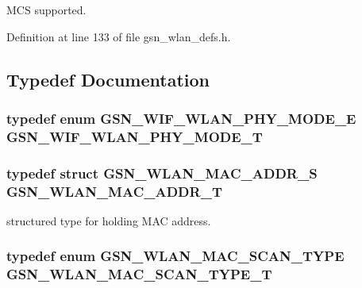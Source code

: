 MCS supported. 



Definition at line 133 of file gsn\_\-wlan\_\-defs.h.



\subsection{Typedef Documentation}
\hypertarget{a00641_ga9f600b5e4ee36d4315abb0cd1e0b1a78}{
\subsubsection[{GSN\_\-WIF\_\-WLAN\_\-PHY\_\-MODE\_\-T}]{\setlength{\rightskip}{0pt plus 5cm}typedef enum {\bf GSN\_\-WIF\_\-WLAN\_\-PHY\_\-MODE\_\-E}  {\bf GSN\_\-WIF\_\-WLAN\_\-PHY\_\-MODE\_\-T}}}
\label{a00641_ga9f600b5e4ee36d4315abb0cd1e0b1a78}
\hypertarget{a00641_gabf7f5cc6656c9288e5d56c8aeafc8477}{
\subsubsection[{GSN\_\-WLAN\_\-MAC\_\-ADDR\_\-T}]{\setlength{\rightskip}{0pt plus 5cm}typedef struct {\bf GSN\_\-WLAN\_\-MAC\_\-ADDR\_\-S}  {\bf GSN\_\-WLAN\_\-MAC\_\-ADDR\_\-T}}}
\label{a00641_gabf7f5cc6656c9288e5d56c8aeafc8477}


structured type for holding MAC address. 

\hypertarget{a00641_gab674354b3ef30f1389f12adc7d3e887e}{
\subsubsection[{GSN\_\-WLAN\_\-MAC\_\-SCAN\_\-TYPE\_\-T}]{\setlength{\rightskip}{0pt plus 5cm}typedef enum {\bf GSN\_\-WLAN\_\-MAC\_\-SCAN\_\-TYPE}  {\bf GSN\_\-WLAN\_\-MAC\_\-SCAN\_\-TYPE\_\-T}}}
\label{a00641_gab674354b3ef30f1389f12adc7d3e887e}


